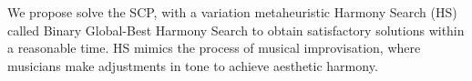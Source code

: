 

We propose solve the SCP, with a variation metaheuristic Harmony Search (HS) called Binary Global-Best Harmony Search to obtain satisfactory solutions within a reasonable time. HS mimics the process of musical improvisation, where musicians make adjustments in tone to achieve aesthetic harmony.